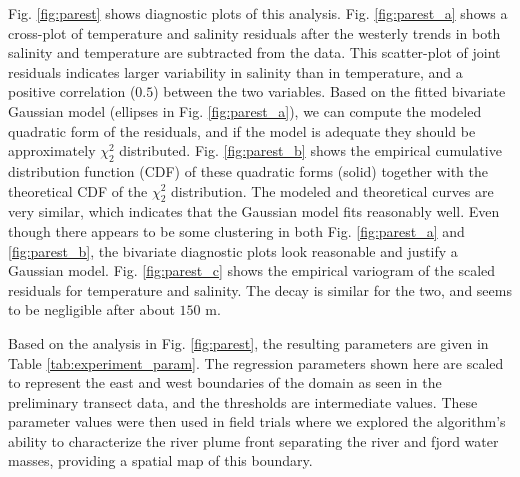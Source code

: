 \documentclass[aoas]{imsart}
\begin{document}
Fig. \ref{fig:parest} shows diagnostic plots of this
analysis. Fig. \ref{fig:parest_a} shows a cross-plot of temperature
and salinity residuals after the westerly trends in both salinity and
temperature are subtracted from the data. This scatter-plot of joint
residuals indicates larger variability in salinity than in
temperature, and a positive correlation ($0.5$) between the two
variables. Based on the fitted bivariate Gaussian model (ellipses in
Fig. \ref{fig:parest_a}), we can compute the modeled quadratic form of
the residuals, and if the model is adequate they should be
approximately $\chi^2_2$ distributed. Fig. \ref{fig:parest_b} shows
the empirical cumulative distribution function (CDF) of these
quadratic forms (solid) together with the theoretical CDF of the
$\chi^2_2$ distribution. The modeled and theoretical curves are very
similar, which indicates that the Gaussian model fits reasonably
well. Even though there appears to be some clustering in both
Fig. \ref{fig:parest_a} and \ref{fig:parest_b}, the bivariate
diagnostic plots look reasonable and justify a Gaussian
model. Fig. \ref{fig:parest_c} shows the empirical variogram of the
scaled residuals for temperature and salinity. The decay is similar
for the two, and seems to be negligible after about $150$ m.


Based on the analysis in Fig. \ref{fig:parest}, the resulting
parameters are given in Table \ref{tab:experiment_param}. The
regression parameters shown here are scaled to represent the east and
west boundaries of the domain as seen in the preliminary transect
data, and the thresholds are intermediate values. These parameter
values were then used in field trials where we explored the
algorithm's ability to characterize the river plume front separating
the river and fjord water masses, providing a spatial map of this
boundary.

\end{document}
